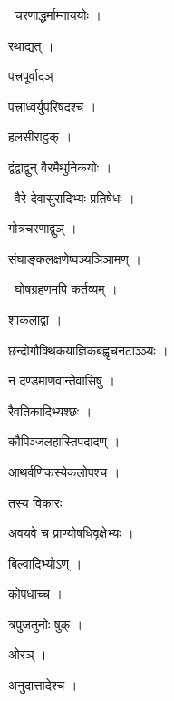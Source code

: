 \documentclass[10pt, openany, oneside]{book}
\begin{document}
\par\noindent\hspace{1.5em}{\vps वा॰}~{\qt चरणाद्धर्माम्नाययोः ।}

\noindent रथाद्यत् ।

\noindent पत्त्रपूर्वादञ् ।

\noindent पत्त्राध्वर्युपरिषदश्च ।

\noindent हलसीराट्ठक् ।

\noindent द्वंद्वाद्वुन् वैरमैथुनिकयोः ।

\par\noindent\hspace{1.5em}{\vps वा॰}~{\qt वैरे देवासुरादिभ्यः प्रतिषेधः ।}

\noindent गोत्रचरणाद्वुञ् ।

\noindent संघाङ्कलक्षणेष्वञ्यञिञामण् ।

\par\noindent\hspace{1.5em}{\vps वा॰}~{\qt घोषग्रहणमपि कर्तव्यम् ।}

\noindent शाकलाद्वा ।

\noindent छन्दोगौक्थिकयाज्ञिकबह्वृचनटाञ्ञ्यः ।

\noindent न दण्डमाणवान्तेवासिषु ।

\noindent रैवतिकादिभ्यश्छः ।

\noindent कौपिञ्जलहास्तिपदादण् ।

\noindent आथर्वणिकस्येकलोपश्च ।

\noindent तस्य विकारः ।

\noindent अवयवे च प्राण्योषधिवृक्षेभ्यः ।

\noindent बिल्वादिभ्योऽण् ।

\noindent कोपधाच्च ।

\noindent त्रपुजतुनोः षुक् ।

\noindent ओरञ् ।

\noindent अनुदात्तादेश्च ।
\end{document}
